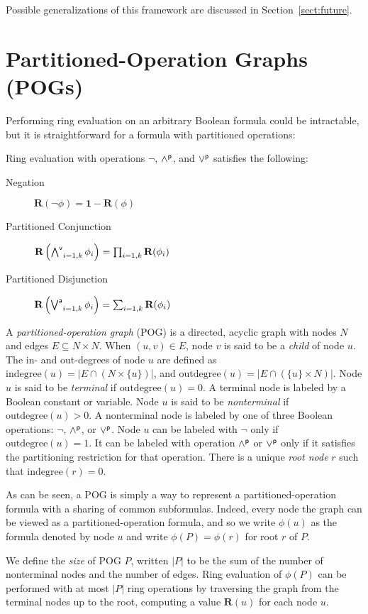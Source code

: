 \documentclass[letterpaper,USenglish,cleveref, autoref, thm-restate]{lipics-v2021}
\newcommand{\pand}{\mathbin{\land^{\sf p}}}
\newcommand{\por}{\mathbin{\lor^{\sf p}}}
\DeclareMathOperator*{\Pand}{\bigwedge^{\sf v}}
\DeclareMathOperator*{\Por}{\bigvee^{\sf a}}
\newcommand{\boolnot}{\neg}
\newcommand{\rep}{\textbf{R}}
\newcommand{\mulident}{\textbf{1}}
\newcommand{\indegree}{\textrm{indegree}}
\newcommand{\outdegree}{\textrm{outdegree}}
\begin{document}
Possible generalizations of this framework are discussed in Section~\ref{sect:future}.

\section{Partitioned-Operation Graphs (POGs)}

Performing ring evaluation on an arbitrary Boolean formula could be intractable, but it is straightforward for a formula with partitioned operations:
\begin{proposition}
Ring evaluation with operations $\boolnot$, $\pand$, and $\por$ satisfies the following:
\begin{description}
\item[Negation] $\rep(\boolnot \phi) = \mulident - \rep(\phi)$
\item[Partitioned Conjunction] $\rep\left(\Pand_{i=1,k} \phi_i\right) = \prod_{i=1,k} \rep(\phi_i)$
\item[Partitioned Disjunction] $\rep\left(\Por_{i=1,k} \phi_i\right) = \sum_{i=1,k} \rep(\phi_i)$
\end{description}
\end{proposition}

A {\em partitioned-operation graph} (POG) is a directed, acyclic graph
with nodes $N$ and edges $E \subseteq N \times N$.  When $(u,v) \in E$,
node $v$ is said to be a {\em child} of node $u$.
The in- and out-degrees of node $u$ are defined as $\indegree(u) = | E \cap (N \times \{u\}) |$, and
$\outdegree(u) = | E \cap (\{u\} \times N) |$.
Node $u$ is said to be {\em terminal} if $\outdegree(u) = 0$.  A terminal node is labeled by a Boolean constant or variable.
Node $u$ is said to be {\em nonterminal} if $\outdegree(u) > 0$.  A nonterminal node is labeled by one of three Boolean operations:
$\boolnot$, $\pand$, or $\por$.  Node $u$ can be labeled with $\boolnot$ only if $\outdegree(u) = 1$.
It can be labeled with operation $\pand$ or $\por$ only if it satisfies the partitioning restriction for that operation.
There is a unique {\em root node} $r$ such that $\indegree(r) = 0$.

As can be seen, a POG is simply a way to represent a partitioned-operation
formula with a sharing of common subformulas.  Indeed, every node the graph can be viewed as a partitioned-operation formula, and so we write
$\phi(u)$ as the formula denoted by node $u$ and write $\phi(P) = \phi(r)$ for root $r$ of $P$.

We define the {\em size} of POG $P$, written $|P|$ to be the sum of
the number of nonterminal nodes and the number of edges.  Ring
evaluation of $\phi(P)$ can be performed with at most $|P|$ ring
operations by traversing the graph from the terminal nodes up to
the root, computing a value $\rep(u)$ for each node $u$.
\end{document}
